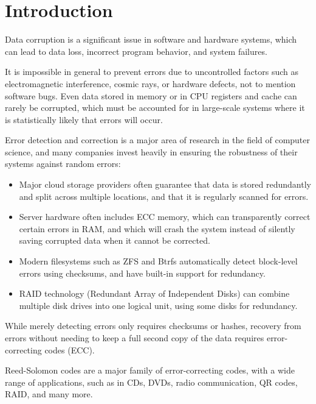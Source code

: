 \chapter{Introduction}

Data corruption is a significant issue in software and hardware systems, which can lead to data loss, incorrect program behavior, and system failures.

It is impossible in general to prevent errors due to uncontrolled factors such as electromagnetic interference, cosmic rays, or hardware defects, not to mention software bugs.
Even data stored in memory or in CPU registers and cache can rarely be corrupted, which must be accounted for in large-scale systems where it is statistically likely that errors will occur.
\cite{radiation-errors, dram-errors-in-the-wild}

Error detection and correction is a major area of research in the field of computer science, and many companies invest heavily in ensuring the robustness of their systems against random errors:

\begin{itemize}[nosep]
    \item Major cloud storage providers often guarantee that data is stored redundantly and split across multiple locations, and that it is regularly scanned for errors. \cite{azure, backblaze, google-cloud}
    \item Server hardware often includes ECC memory, which can transparently correct certain errors in RAM, and which will crash the system instead of silently saving corrupted data when it cannot be corrected. \cite{ecc-market, azure-ecc}
    \item Modern filesystems such as ZFS and Btrfs automatically detect block-level errors using checksums, and have built-in support for redundancy. \cite{zfs-vs-btrfs}
    \item RAID technology (Redundant Array of Independent Disks) can combine multiple disk drives into one logical unit, using some disks for redundancy. \cite{raid-case}
\end{itemize}

While merely detecting errors only requires checksums or hashes, recovery from errors without needing to keep a full second copy of the data requires error-correcting codes (ECC).

Reed-Solomon codes are a major family of error-correcting codes, with a wide range of applications, such as in CDs, DVDs, radio communication, QR codes, RAID, and many more.

